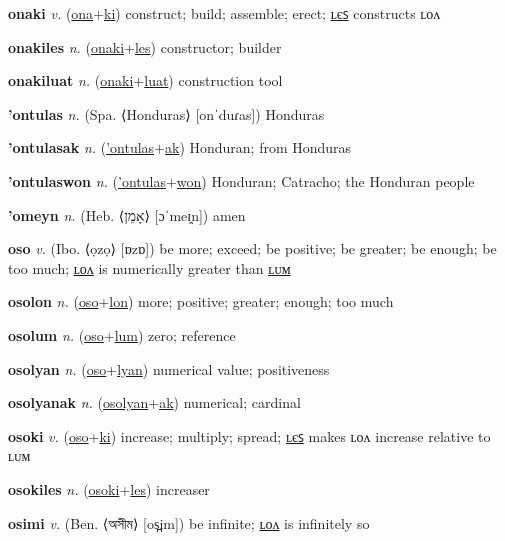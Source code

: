 \textbf{\hypertarget{onaki}{onaki}} \textit{v.} (\hyperlink{ona}{ona}+\allowbreak \hyperlink{ki}{ki})
construct; build; assemble; erect; \hyperlink{onakiles}{ʟєꜱ} constructs ʟᴏᴧ

\textbf{\hypertarget{onakiles}{onakiles}} \textit{n.} (\hyperlink{onaki}{onaki}+\allowbreak \hyperlink{les}{les})
constructor; builder

\textbf{\hypertarget{onakiluat}{onakiluat}} \textit{n.} (\hyperlink{onaki}{onaki}+\allowbreak \hyperlink{luat}{luat})
construction tool

\textbf{\hypertarget{'ontulas}{'ontulas}} \textit{n.} (Spa. ⟨Honduras⟩ [onˈduɾas])
Honduras

\textbf{\hypertarget{'ontulasak}{'ontulasak}} \textit{n.} (\hyperlink{'ontulas}{'ontulas}+\allowbreak \hyperlink{ak}{ak})
Honduran; from Honduras

\textbf{\hypertarget{'ontulaswon}{'ontulaswon}} \textit{n.} (\hyperlink{'ontulas}{'ontulas}+\allowbreak \hyperlink{won}{won})
Honduran; Catracho; the Honduran people

\textbf{\hypertarget{'omeyn}{'omeyn}} \textit{n.} (Heb. ⟨{\hebrew{}אָמֵן}⟩ [ɔˈmeɪ̯n])
amen

\textbf{\hypertarget{oso}{oso}} \textit{v.} (Ibo. ⟨ọzọ⟩ [ɒzɒ])
be more; exceed; be positive; be greater; be enough; be too much; \hyperlink{osolon}{ʟᴏᴧ} is numerically greater than \hyperlink{osolum}{ʟᴜᴍ}

\textbf{\hypertarget{osolon}{osolon}} \textit{n.} (\hyperlink{oso}{oso}+\allowbreak \hyperlink{lon}{lon})
more; positive; greater; enough; too much

\textbf{\hypertarget{osolum}{osolum}} \textit{n.} (\hyperlink{oso}{oso}+\allowbreak \hyperlink{lum}{lum})
zero; reference

\textbf{\hypertarget{osolyan}{osolyan}} \textit{n.} (\hyperlink{oso}{oso}+\allowbreak \hyperlink{lyan}{lyan})
numerical value; positiveness

\textbf{\hypertarget{osolyanak}{osolyanak}} \textit{n.} (\hyperlink{osolyan}{osolyan}+\allowbreak \hyperlink{ak}{ak})
numerical; cardinal

\textbf{\hypertarget{osoki}{osoki}} \textit{v.} (\hyperlink{oso}{oso}+\allowbreak \hyperlink{ki}{ki})
increase; multiply; spread; \hyperlink{osokiles}{ʟєꜱ} makes ʟᴏᴧ increase relative to ʟᴜᴍ

\textbf{\hypertarget{osokiles}{osokiles}} \textit{n.} (\hyperlink{osoki}{osoki}+\allowbreak \hyperlink{les}{les})
increaser

\textbf{\hypertarget{osimi}{osimi}} \textit{v.} (Ben. ⟨{\bengali{}অসীম}⟩ [os̪im])
be infinite; \hyperlink{osimilon}{ʟᴏᴧ} is infinitely so

